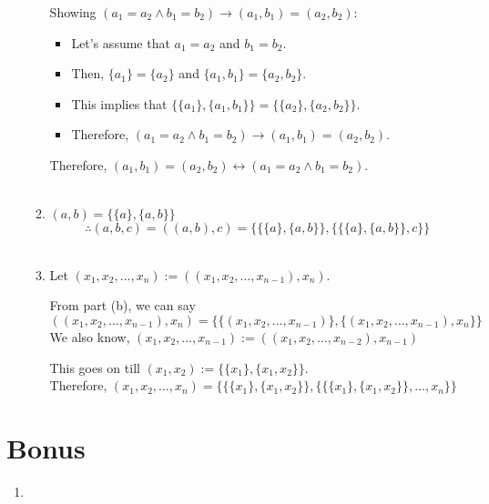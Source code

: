 \documentclass[a4paper]{article}
\begin{document}
\begin{enumerate}
\begin{enumerate}
            Showing $(a_1 = a_2 \land b_1 = b_2) \rightarrow (a_1, b_1) = (a_2, b_2)$:
            \begin{itemize}
                \item Let's assume that $a_1 = a_2$ and $b_1 = b_2$.\\
                \item Then, $\{ a_1\} = \{ a_2\}$ and $\{a_1, b_1 \} = \{a_2, b_2 \}$.\\
                \item This implies that $\{\{ a_1\}, \{a_1, b_1 \}\} = \{\{ a_2\}, \{a_2, b_2 \}\}$.\\
                \item Therefore, $(a_1 = a_2 \land b_1 = b_2) \rightarrow (a_1, b_1) = (a_2, b_2)$.\\
            \end{itemize}

            Therefore, $(a_1, b_1) = (a_2, b_2) \leftrightarrow (a_1 = a_2 \land b_1 = b_2)$.\\ \\


            \item $(a, b) = \{\{ a\}, \{a, b \}\}$\\
            \[\therefore (a, b, c) = ((a, b), c) = \{\{\{ a\}, \{a, b \}\}, \{\{\{ a\}, \{a, b \}\}, c \}\}\] \\

            \item Let $(x_1, x_2, \dots, x_n) := ((x_1, x_2, \dots, x_{n-1}), x_n)$.

            From part (b), we can say  $((x_1, x_2, \dots, x_{n-1}), x_n) = \{\{(x_1, x_2, \dots, x_{n-1})\}, \{(x_1, x_2, \dots, x_{n-1}), x_n\}\}$\\

            We also know, $(x_1, x_2, \dots, x_{n-1}) := ((x_1, x_2, \dots, x_{n-2}), x_{n-1})$

            This goes on till $(x_1, x_2) := \{\{ x_1\}, \{x_1, x_2 \}\}$.\\

            Therefore, $(x_1, x_2, \dots, x_n) = \{\{\{ x_1\}, \{x_1, x_2 \}\}, \{\{\{ x_1\}, \{x_1, x_2 \}\}, \dots, x_n \}\}$\\
        \end{enumerate}
    \end{enumerate}

\newpage
\section{Bonus}
    \begin{enumerate}
        \item 
    \end{enumerate}
\end{document}
